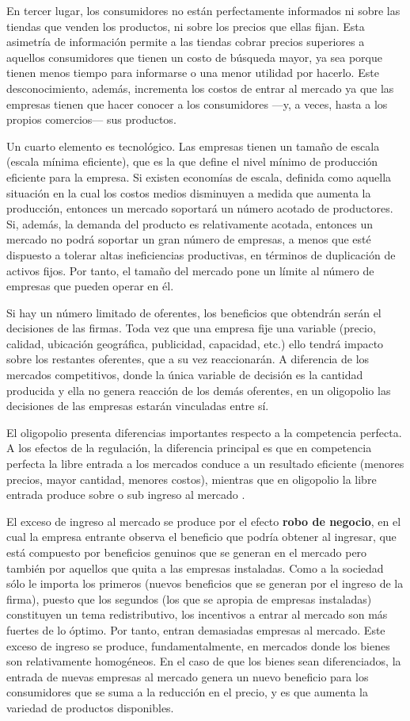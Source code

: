 \documentclass[
  12pt,
  spanish,
]{book}
\begin{document}
En tercer lugar, los consumidores no están perfectamente informados ni sobre las tiendas que venden los productos, ni sobre los precios que ellas fijan. Esta asimetría de información permite a las tiendas cobrar precios superiores a aquellos consumidores que tienen un costo de búsqueda mayor, ya sea porque tienen menos tiempo para informarse o una menor utilidad por hacerlo. Este desconocimiento, además, incrementa los costos de entrar al mercado ya que las empresas tienen que hacer conocer a los consumidores ---y, a veces, hasta a los propios comercios--- sus productos.

Un cuarto elemento es tecnológico. Las empresas tienen un tamaño de escala (escala mínima eficiente), que es la que define el nivel mínimo de producción eficiente para la empresa. Si existen economías de escala, definida como aquella situación en la cual los costos medios disminuyen a medida que aumenta la producción, entonces un mercado soportará un número acotado de productores. Si, además, la demanda del producto es relativamente acotada, entonces un mercado no podrá soportar un gran número de empresas, a menos que esté dispuesto a tolerar altas ineficiencias productivas, en términos de duplicación de activos fijos. Por tanto, el tamaño del mercado pone un límite al número de empresas que pueden operar en él.

Si hay un número limitado de oferentes, los beneficios que obtendrán serán el decisiones de las firmas. Toda vez que una empresa fije una variable (precio, calidad, ubicación geográfica, publicidad, capacidad, etc.) ello tendrá impacto sobre los restantes oferentes, que a su vez reaccionarán. A diferencia de los mercados competitivos, donde la única variable de decisión es la cantidad producida y ella no genera reacción de los demás oferentes, en un oligopolio las decisiones de las empresas estarán vinculadas entre sí.

El oligopolio presenta diferencias importantes respecto a la competencia perfecta. A los efectos de la regulación, la diferencia principal es que en competencia perfecta la libre entrada a los mercados conduce a un resultado eficiente (menores precios, mayor cantidad, menores costos), mientras que en oligopolio la libre entrada produce sobre o sub ingreso al mercado \citep{Mankiw1986}.

El exceso de ingreso al mercado se produce por el efecto \textbf{robo de negocio}, en el cual la empresa entrante observa el beneficio que podría obtener al ingresar, que está compuesto por beneficios genuinos que se generan en el mercado pero también por aquellos que quita a las empresas instaladas. Como a la sociedad sólo le importa los primeros (nuevos beneficios que se generan por el ingreso de la firma), puesto que los segundos (los que se apropia de empresas instaladas) constituyen un tema redistributivo, los incentivos a entrar al mercado son más fuertes de lo óptimo. Por tanto, entran demasiadas empresas al mercado. Este exceso de ingreso se produce, fundamentalmente, en mercados donde los bienes son relativamente homogéneos. En el caso de que los bienes sean diferenciados, la entrada de nuevas empresas al mercado genera un nuevo beneficio para los consumidores que se suma a la reducción en el precio, y es que aumenta la variedad de productos disponibles.
\end{document}
